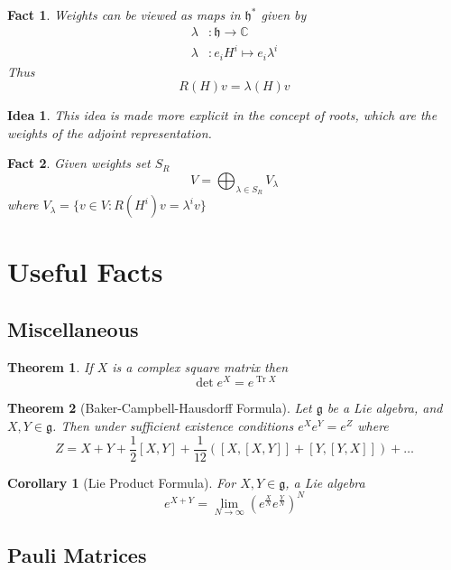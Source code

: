 \documentclass{article}
\newtheorem{theorem}{Theorem}[subsection]
\newtheorem{corollary}{Corollary}[theorem]
\newtheorem{fact}{Fact}[subsection]
\newtheorem*{idea}{Idea}
\DeclareMathOperator{\tr}{Tr}
\newcommand{\mf}[1]{\mathfrak{#1}}
\newcommand{\mbb}[1]{\mathbb{#1}}
\newcommand{\comm}[2][]{\left[ #1, #2 \right]}
\begin{document}
\begin{fact}
Weights can be viewed as maps in $\mf{h}^\ast$ given by 
\begin{align*}
\lambda &:\mf{h}\to\mbb{C} \\
\lambda &: e_i H^i \mapsto e_i \lambda^i
\end{align*}
Thus 
\[
R(H)v=\lambda(H)v
\]
\end{fact}

\begin{idea}
This idea is made more explicit in the concept of roots, which are the weights of the adjoint representation. 
\end{idea}

\begin{fact}
Given weights set $S_R$
\[
V=\bigoplus_{\lambda\in S_R} V_\lambda
\]
where $V_\lambda=\lbrace v\in V : R(H^i)v=\lambda^i v\rbrace$
\end{fact}
\section{Useful Facts}

\subsection{Miscellaneous}
\begin{theorem}
If $X$ is a complex square matrix then 
\[
\det{e^X}=e^{\tr{X}}
\]
\end{theorem}

\begin{theorem}[Baker-Campbell-Hausdorff Formula]
Let $\mf{g}$ be a Lie algebra, and $X,Y\in\mf{g}$. Then under sufficient existence conditions $e^X e^Y=e^Z$ where
\[
Z=X+Y+\frac{1}{2}\comm[X]{Y}+\frac{1}{12}\left(\comm[X]{\comm[X]{Y}}+\comm[Y]{\comm[Y]{X}}\right)+\dots
\]
\end{theorem}

\begin{corollary}[Lie Product Formula]
For $X,Y\in\mf{g}$, a Lie algebra
\[
e^{X+Y}=\lim_{N\to\infty}\left( e^{\frac{X}{N}} e^{\frac{Y}{N}} \right)^N
\]
\end{corollary}
\subsection{Pauli Matrices}
\end{document}
